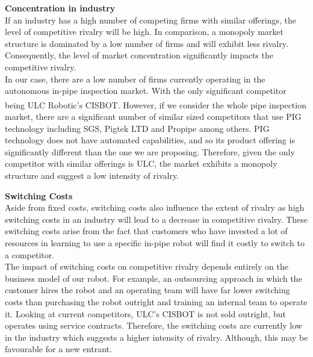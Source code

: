 \documentclass[11pt]{article}		%
\newcommand{\supercite}[1]{\textsuperscript{\cite{#1}}}		%
\begin{document}
		        \textbf{Concentration in industry}
		        \\
		        If an industry has a high number of competing firms with similar offerings, the level of competitive rivalry will be high. In comparison, a monopoly market structure is dominated by a low number of firms and will exhibit less rivalry. Consequently, the level of market concentration significantly impacts the competitive rivalry.
		        \\
                \hspace*{3ex}In our case, there are a low number of firms currently operating in the autonomous in-pipe inspection market. With the only significant competitor being ULC Robotic’s CISBOT\supercite{cisbotbeast}. However, if we consider the whole pipe inspection market, there are a significant number of similar sized competitors that use PIG technology including SGS, Pigtek LTD and Propipe among others. PIG technology does not have automated capabilities, and so its product offering is significantly different than the one we are proposing. Therefore, given the only competitor with similar offerings is ULC, the market exhibits a monopoly structure and suggest a low intensity of rivalry.
		        
		        \textbf{Switching Costs}
		        \\
		        Aside from fixed costs, switching costs also influence the extent of rivalry as high switching costs in an industry will lead to a decrease in competitive rivalry. These switching costs arise from the fact that customers who have invested a lot of resources in learning to use a specific in-pipe robot will find it costly to switch to a competitor. 
		        \\
		        \hspace*{3ex}The impact of switching costs on competitive rivalry depends entirely on the business model of our robot. For example, an outsourcing approach in which the customer hires the robot and an operating team will have far lower switching costs than purchasing the robot outright and training an internal team to operate it. Looking at current competitors, ULC’s CISBOT is not sold outright, but operates using service contracts. Therefore, the switching costs are currently low in the industry which suggests a higher intensity of rivalry. Although, this may be favourable for a new entrant. 
		
\end{document}
